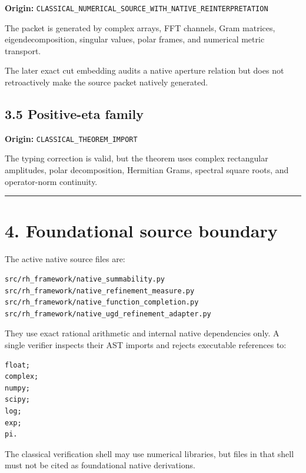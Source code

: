 \textbf{Origin:} \texttt{CLASSICAL\_NUMERICAL\_SOURCE\_WITH\_NATIVE\_REINTERPRETATION}

The packet is generated by complex arrays, FFT channels, Gram matrices,
eigendecomposition, singular values, polar frames, and numerical metric
transport.

The later exact cut embedding audits a native aperture relation but does not
retroactively make the source packet natively generated.

\hypertarget{positive-eta-family}{%
\subsection{3.5 Positive-eta family}\label{positive-eta-family}}

\textbf{Origin:} \texttt{CLASSICAL\_THEOREM\_IMPORT}

The typing correction is valid, but the theorem uses complex rectangular
amplitudes, polar decomposition, Hermitian Grams, spectral square roots, and
operator-norm continuity.

\begin{center}\rule{0.5\linewidth}{0.5pt}\end{center}

\hypertarget{foundational-source-boundary}{%
\section{4. Foundational source boundary}\label{foundational-source-boundary}}

The active native source files are:

\begin{verbatim}
src/rh_framework/native_summability.py
src/rh_framework/native_refinement_measure.py
src/rh_framework/native_function_completion.py
src/rh_framework/native_ugd_refinement_adapter.py
\end{verbatim}

They use exact rational arithmetic and internal native dependencies only. A
single verifier inspects their AST imports and rejects executable references to:

\begin{verbatim}
float;
complex;
numpy;
scipy;
log;
exp;
pi.
\end{verbatim}

The classical verification shell may use numerical libraries, but files in that
shell must not be cited as foundational native derivations.

